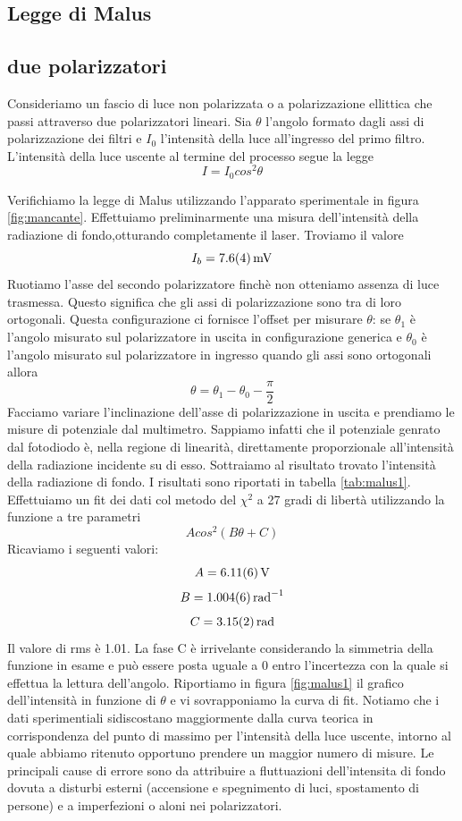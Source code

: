 \documentclass[10pt,oneside,a4paper]{article}
\begin{document}
\begin{multicols}{2}
\section{Legge di Malus}
\subsection{due polarizzatori}
Consideriamo un fascio di luce non polarizzata o a polarizzazione ellittica che passi attraverso due polarizzatori lineari. Sia $\theta$ l'angolo formato dagli assi di polarizzazione dei filtri e $I_0$ l'intensità della luce all'ingresso del primo filtro. L'intensità della luce uscente al termine del processo segue la legge
\begin{equation}\label{eq:Malus1}
  I = I_0cos^2\theta
\end{equation}

Verifichiamo la legge di Malus utilizzando l'apparato sperimentale in figura \ref{fig:mancante}. Effettuiamo preliminarmente una misura dell'intensità della radiazione di fondo,otturando completamente il laser. Troviamo il valore
$$I_b = \SI{7.6 \pm 0.4}{mV}$$
Ruotiamo l'asse del secondo polarizzatore finchè non otteniamo assenza di luce trasmessa. Questo significa che gli assi di polarizzazione sono tra di loro ortogonali. Questa configurazione ci fornisce l'offset per misurare $\theta$: se $\theta_1$ è l'angolo misurato sul polarizzatore in uscita in configurazione generica e $\theta_0$ è l'angolo misurato sul polarizzatore in ingresso quando gli assi sono ortogonali allora
$$\theta = \theta_1 - \theta_0 - \frac{\pi}{2} $$
Facciamo variare l'inclinazione dell'asse di polarizzazione in uscita e prendiamo le misure di potenziale dal multimetro. Sappiamo infatti che il potenziale genrato dal fotodiodo è, nella regione di linearità, direttamente proporzionale all'intensità della radiazione incidente su di esso. Sottraiamo al risultato trovato l'intensità della radiazione di fondo. I risultati sono riportati in tabella \ref{tab:malus1}. Effettuiamo un fit dei dati col metodo del $\chi^2$ a 27 gradi di libertà utilizzando la funzione a tre parametri
$$Acos^2(B\theta + C)$$
Ricaviamo i seguenti valori:
$$A = \SI{6.11 \pm 0.06}{V}$$
$$B = \SI{1.004 \pm 0.006}{rad^{-1}}$$
$$C = \SI{3.15 \pm 0.02}{rad}$$
Il valore di rms è 1.01. La fase C è irrivelante considerando la simmetria della funzione in esame e può essere posta uguale a 0 entro l'incertezza con la quale si effettua la lettura dell'angolo.
Riportiamo in figura \ref{fig:malus1} il grafico dell'intensità in funzione di $\theta$ e vi sovrapponiamo la curva di fit. Notiamo che i dati sperimentiali sidiscostano maggiormente dalla curva teorica in corrispondenza del punto di massimo per l'intensità della luce uscente, intorno al quale abbiamo ritenuto opportuno prendere un maggior numero di misure.
Le principali cause di errore sono da attribuire a fluttuazioni dell'intensita di fondo dovuta a disturbi esterni (accensione e spegnimento di luci, spostamento di persone) e a imperfezioni o aloni nei polarizzatori.



\end{multicols}
\end{document}

